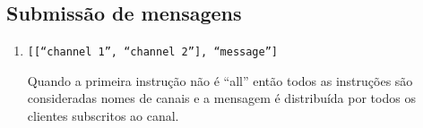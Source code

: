 
\subsection{Submissão de mensagens}
\begin{enumerate}
\item
\texttt{[[``channel 1'', ``channel 2''], ``message'']}

Quando a primeira instrução não é ``all'' então todos as instruções são consideradas nomes de canais e a mensagem é distribuída por todos os clientes subscritos ao canal.

\end{enumerate}


